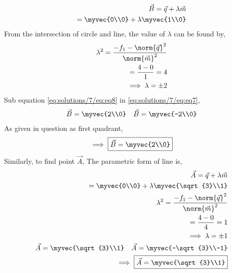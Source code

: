 \begin{align}
    \vec{B} = \vec{q}+\lambda\vec{m}\\
=\myvec{0\\0}+\lambda\myvec{1\\0} \label{eq:solutions/7/eq:eq7}
\end{align}
From the intersection of circle and line, the value of $\lambda$ can be found by,
\begin{align}
    \lambda^2 = \frac{-f_1-\norm{\vec{q}}^2}{\norm{\vec{m}}^2}\\
                = \frac{4-0}{1} = 4\\
    \implies \lambda = \pm{2} \label{eq:solutions/7/eq:eq8}
\end{align}
Sub equation \eqref{eq:solutions/7/eq:eq8} in \eqref{eq:solutions/7/eq:eq7},
\begin{align}
    \vec{B} = \myvec{2\\0}\quad \vec{B} = \myvec{-2\\0} \label{eq:solutions/7/eq:eq9}
\end{align}
As given in question as first quadrant,
\begin{align}
    \implies \boxed{\vec{B} = \myvec{2\\0}} \label{eq:solutions/7/eq:eq10}
\end{align}
Similarly, to find point $\vec{A}$,
The parametric form of line is,
\begin{align}
    \vec{A} = \vec{q}+\lambda\vec{m}\\
            = \myvec{0\\0}+\lambda\myvec{\sqrt{3}\\1}\\
    \lambda^2 = \frac{-f_1-\norm{\vec{q}}^2}{\norm{\vec{m}}^2}\\
                = \frac{4-0}{4} = 1\\
    \implies \lambda = \pm{1} \label{eq:solutions/7/eq:eq11}\\
    \vec{A} = \myvec{\sqrt{3}\\1}\quad \vec{A} = \myvec{-\sqrt{3}\\-1}\label{eq:solutions/7/eq:eq12}\\
\implies\boxed{\vec{A}=\myvec{\sqrt{3}\\1}}
\end{align}
